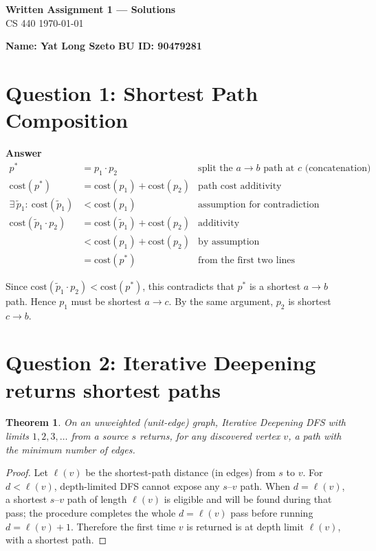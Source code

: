 \documentclass[11pt]{article}
\newtheorem{theorem}{Theorem}
\theoremstyle{definition}
\theoremstyle{remark}
\begin{document}
\begin{center}
{\Large \textbf{Written Assignment 1 — Solutions}}\\[0.25em]
CS 440 \quad \today
\end{center}

\noindent\textbf{Name: Yat Long Szeto} \quad
\textbf{BU ID:  90479281} 

\bigskip

\section*{Question 1: Shortest Path Composition}

\noindent\textbf{Answer}\\
\begin{align*}
p^\ast &= p_1 \cdot p_2 &\text{split the $a\!\to\! b$ path at $c$ (concatenation)}\\
\text{cost}(p^\ast) &= \text{cost}(p_1) + \text{cost}(p_2) &\text{path cost additivity}\\
\exists\,\tilde p_1:\ \text{cost}(\tilde p_1) &< \text{cost}(p_1) &\text{assumption for contradiction}\\
\text{cost}(\tilde p_1\!\cdot\! p_2) &= \text{cost}(\tilde p_1) + \text{cost}(p_2) &\text{additivity}\\
&< \text{cost}(p_1) + \text{cost}(p_2) &\text{by assumption}\\
&= \text{cost}(p^\ast) &\text{from the first two lines}
\end{align*}

Since $\text{cost}(\tilde p_1\!\cdot\! p_2) < \text{cost}(p^\ast)$, 
this contradicts that $p^\ast$ is a shortest $a\!\to\! b$ path. 
Hence $p_1$ must be shortest $a\!\to\! c$. By the same argument, $p_2$ is shortest $c\!\to\! b$.


\section*{Question 2: Iterative Deepening returns shortest paths}
\begin{theorem}
On an unweighted (unit-edge) graph, Iterative Deepening DFS with limits $1,2,3,\dots$ from a source $s$ returns, for any discovered vertex $v$, a path with the minimum number of edges.
\end{theorem}

\begin{proof}
Let $\ell(v)$ be the shortest-path distance (in edges) from $s$ to $v$. For $d<\ell(v)$, depth-limited DFS cannot expose any $s$–$v$ path. When $d=\ell(v)$, a shortest $s$–$v$ path of length $\ell(v)$ is eligible and will be found during that pass; the procedure completes the whole $d=\ell(v)$ pass before running $d=\ell(v){+}1$. Therefore the first time $v$ is returned is at depth limit $\ell(v)$, with a shortest path.
\end{proof}
\end{document}

